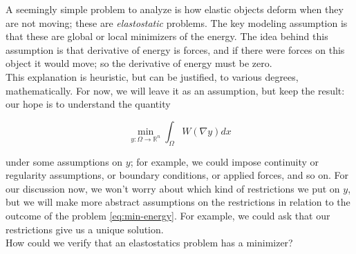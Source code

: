 \documentclass[../main.tex]{subfile}
\begin{document}
A seemingly simple problem to analyze is how elastic objects deform when they are not moving; these are \emph{elastostatic} problems.
The key modeling assumption is that these are global or local minimizers of the energy.
The idea behind this assumption is that derivative of energy is forces, and if there were forces on this object it would move; so the derivative of energy must be zero. \\

This explanation is heuristic, but can be justified, to various degrees, mathematically.
For now, we will leave it as an assumption, but keep the result: our hope is to understand the quantity

\begin{equation}
  \label{eq:min-energy}
  \min_{y: \Omega \to \mathbb{R}^n} \int_{\Omega}W( \nabla y) dx
\end{equation}

under some assumptions on $y$; for example, we could impose continuity or regularity assumptions, or boundary conditions, or applied forces, and so on.
For our discussion now, we won't worry about which kind of restrictions we put on $y$, but we will make more abstract assumptions on the restrictions in relation to the outcome of the problem \eqref{eq:min-energy}.
For example, we could ask that our restrictions give us a unique solution. \\

How could we verify that an elastostatics problem has a minimizer?




\printbibliography
\end{document}
